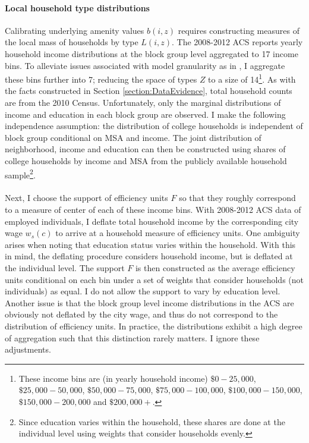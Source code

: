 \documentclass[]{article}
\begin{document}
\paragraph*{Local household type distributions} Calibrating underlying amenity values $b(i, z)$ requires constructing measures of the local mass of households by type $L(i, z)$. The 2008-2012 ACS reports yearly household income distributions at the block group level aggregated to 17 income bins. To alleviate issues associated with model granularity as in \cite{DingelTintelnot:2021}, I aggregate these bins further into 7; reducing the space of types $Z$ to a size of 14\footnote{These income bins are (in yearly household income) $\$0-25,000$, $\$25,000-50,000$, $\$50,000-75,000$, $\$75,000-100,000$, $\$100,000-150,000$, $\$150,000-200,000$ and $\$200,000+$.}. As with the facts constructed in Section \ref{section:DataEvidence}, total household counts are from the 2010 Census. Unfortunately, only the marginal distributions of income and education in each block group are observed. I make the following independence assumption: the distribution of college households is independent of block group conditional on MSA and income. The joint distribution of neighborhood, income and education can then be constructed using shares of college households by income and MSA from the publicly available household sample\footnote{Since education varies within the household, these shares are done at the individual level using weights that consider households evenly.}.

\paragraph*{}
Next, I choose the support of efficiency units $F$ so that they roughly correspond to a measure of center of each of these income bins. With 2008-2012 ACS data of employed individuals, I deflate total household income by the corresponding city wage $w_{s}(c)$ to arrive at a household measure of efficiency units. One ambiguity arises when noting that education status varies within the household. With this in mind, the deflating procedure considers household income, but is deflated at the individual level. The support $F$ is then constructed as the average efficiency units conditional on each bin under a set of weights that consider households (not individuals) as equal. I do not allow the support to vary by education level. Another issue is that the block group level income distributions in the ACS are obviously not deflated by the city wage, and thus do not correspond to the distribution of efficiency units. In practice, the distributions exhibit a high degree of aggregation such that this distinction rarely matters. I ignore these adjustments.
\end{document}

